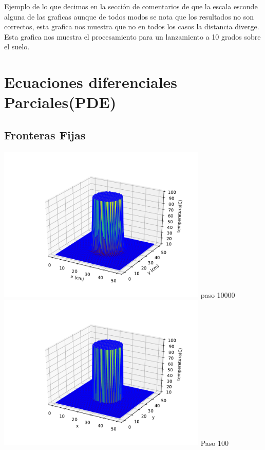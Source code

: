 \documentclass[12pt]{article}
\begin{document}
\begin{centering}
Ejemplo de lo que decimos en la secci\'on de comentarios de que la escala esconde alguna de las graficas aunque de todos modos se nota que los resultados no son correctos, esta grafica nos muestra que no en todos los casos la distancia diverge. Esta grafica nos muestra el procesamiento para un lanzamiento a 10 grados sobre el suelo.
\end{centering}


\section{Ecuaciones diferenciales Parciales(PDE)}

\begin{centering}

\subsection{Fronteras Fijas}
\includegraphics[width=0.75\textwidth]{3d2.pdf}
paso 10000
\\
\includegraphics[width=0.75\textwidth]{3d3.pdf}
Paso 100
\\

\end{centering}
\end{document}
